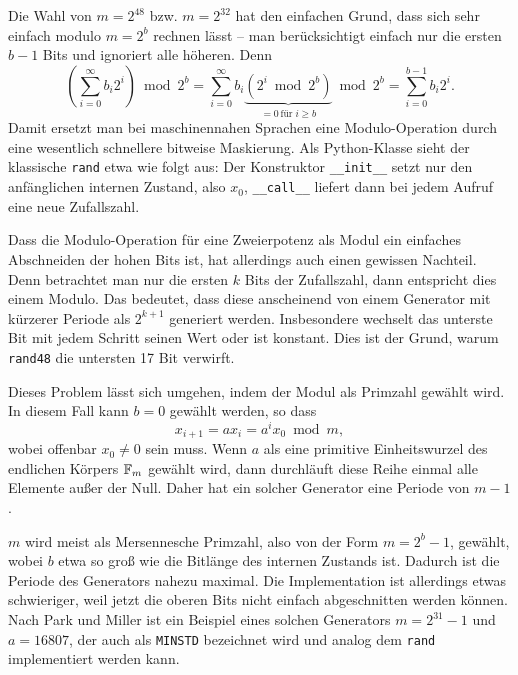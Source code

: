 Die Wahl von $m=2^{48}$ bzw. $m=2^{32}$ hat den einfachen Grund, dass
sich sehr einfach modulo $m=2^b$ rechnen lässt -- man berücksichtigt
einfach nur die ersten $b-1$ Bits und ignoriert alle höheren. Denn
\begin{equation}
  \label{eq:lcgmod}
  \left(\sum_{i=0}^\infty b_i 2^i\right) \bmod 2^b =
  \sum_{i=0}^\infty b_i \underbrace{\left(  2^i \bmod 2^b \right)}_{=
      0\,\text{für}\; i\ge b} \bmod 2^b = \sum_{i=0}^{b-1} b_i 2^i.
\end{equation}
Damit ersetzt man bei maschinennahen Sprachen eine Modulo-Operation
durch eine wesentlich schnellere bitweise Maskierung. Als
Python-Klasse sieht der klassische \texttt{rand} etwa wie folgt aus:
%
Der Konstruktor \lstinline!__init__! setzt nur den anfänglichen
internen Zustand, also $x_0$, \lstinline!__call__! liefert dann bei
jedem Aufruf eine neue Zufallszahl.

Dass die Modulo-Operation für eine Zweierpotenz als Modul ein
einfaches Abschneiden der hohen Bits ist, hat allerdings auch einen
gewissen Nachteil. Denn betrachtet man nur die ersten $k$ Bits der
Zufallszahl, dann entspricht dies einem Modulo. Das bedeutet, dass
diese anscheinend von einem Generator mit kürzerer Periode als
$2^{k+1}$ generiert werden.  Insbesondere wechselt das unterste Bit
mit jedem Schritt seinen Wert oder ist konstant.  Dies ist der Grund,
warum \texttt{rand48} die untersten 17 Bit verwirft.

Dieses Problem lässt sich umgehen, indem der Modul als Primzahl
gewählt wird. In diesem Fall kann $b=0$ gewählt werden, so dass
\begin{equation}
  x_{i+1} = a x_i = a^i x_0 \bmod m,
\end{equation}
wobei offenbar $x_0\neq 0$ sein muss. Wenn $a$ als eine primitive
Einheitswurzel des endlichen Körpers $\mathbb{F}_m$ gewählt wird, dann
durchläuft diese Reihe einmal alle Elemente außer der Null. Daher hat
ein solcher Generator eine Periode von $m-1$.

$m$ wird meist als Mersennesche Primzahl, also von der Form $m=2^b -
1$, gewählt, wobei $b$ etwa so groß wie die Bitlänge des internen
Zustands ist. Dadurch ist die Periode des Generators nahezu maximal.
Die Implementation ist allerdings etwas schwieriger, weil jetzt die
oberen Bits nicht einfach abgeschnitten werden können. Nach Park und
Miller ist ein Beispiel eines solchen Generators $m=2^{31}-1$ und
$a=16807$, der auch als \texttt{MINSTD} bezeichnet wird und analog dem
\texttt{rand} implementiert werden kann.

